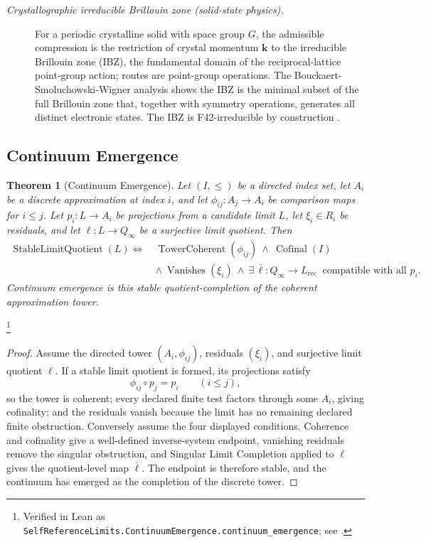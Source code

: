 \documentclass[11pt]{article}
\newtheorem{theorem}{Theorem}[section]
\theoremstyle{definition}
\begin{document}
\begin{description}
\item[\emph{Crystallographic irreducible Brillouin
zone (solid-state physics).}]
For a periodic crystalline solid with space group
\(G\), the admissible compression is the
restriction of crystal momentum \(\mathbf k\) to the
irreducible Brillouin zone (IBZ), the fundamental
domain of the reciprocal-lattice point-group action;
routes are point-group operations.  The
Bouckaert-Smoluchowski-Wigner analysis shows the
IBZ is the minimal subset of the full Brillouin
zone that, together with symmetry operations,
generates all distinct electronic states.  The IBZ
is F42-irreducible by construction
\citep{BouckaertSmoluchowskiWigner1936Theory}.
\end{description}

\subsection{Continuum Emergence}\label{sec:self-reference-limits:continuum-emergence}

\begin{theorem}[Continuum Emergence]\label{thm:F43}
Let \((I,\le)\) be a directed index set, let \(A_i\) be a discrete
approximation at index \(i\), and let
\(\phi_{ij}:A_j\to A_i\) be comparison maps for \(i\le j\). Let
\(p_i:L\to A_i\) be projections from a candidate limit \(L\), let
\(\xi_i\in R_i\) be residuals, and let
\(\ell:L\to Q_\infty\) be a surjective limit quotient. Then
\begin{align*}
  \operatorname{StableLimitQuotient}(L)
  \iff\
  &\operatorname{TowerCoherent}(\phi_{ij})
  \ \wedge\
  \operatorname{Cofinal}(I)\\
  &\wedge\
  \operatorname{Vanishes}(\xi_i)
  \ \wedge\
  \exists\,\bar\ell:Q_\infty\to L_{\mathrm{rec}}\ \text{ compatible with all }p_i .
\end{align*}
Continuum emergence is this stable quotient-completion of the
coherent approximation tower.
\end{theorem}
\footnote{\raggedright Verified in Lean as
\texttt{SelfReferenceLimits.\allowbreak{}ContinuumEmergence.\allowbreak{}continuum\_emergence};
see \Cref{app:formalization}.}
\begin{proof}
Assume the directed tower \((A_i,\phi_{ij})\), residuals \((\xi_i)\),
and surjective limit quotient \(\ell\). If a stable limit quotient is
formed, its projections satisfy
\[
  \phi_{ij}\circ p_j=p_i\qquad (i\le j),
\]
so the tower is coherent; every declared finite test factors through
some \(A_i\), giving cofinality; and the residuals vanish because the
limit has no remaining declared finite obstruction. Conversely assume
the four displayed conditions. Coherence and cofinality give a
well-defined inverse-system endpoint, vanishing residuals remove the
singular obstruction, and Singular Limit Completion applied to
\(\ell\) gives the quotient-level map \(\bar\ell\). The endpoint is
therefore stable, and the continuum has emerged as the completion of
the discrete tower.
\end{proof}
\end{document}

